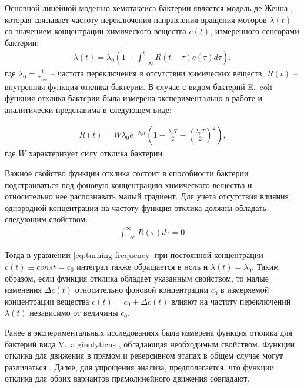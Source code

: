 Основной линейной моделью хемотаксиса бактерии является модель де Женна \cite{de_gennes_chemotaxis_2004}, которая связывает частоту переключения направления вращения моторов $\lambda(t)$ со значением концентрации химического вещества $c(t)$, измеренного сенсорами бактерии:
\begin{equation}
    \begin{aligned}
        \lambda(t)=\lambda_0 \left ( 1 - \int_{-\infty}^t R(t-\tau)c(\tau)d\tau \right ),
    \label{eq:turning-frequency}
    \end{aligned}
\end{equation}
где $\lambda_0=\frac{1}{\tau_{run}}$ -- частота переключения в отсутствии химических веществ, $R(t)$ -- внутренняя функция отклика бактерии. В случае с видом бактерий E.~coli функция отклика бактерии была измерена экспериментально в работе \cite{block_adaptation_1983} и аналитически представима в следующем виде:

\begin{equation}
    \begin{aligned}
        R(t) = W \lambda_0 e^{-\lambda_0t} \left ( 1 - \frac{\lambda_0T}{2} - \left (\frac{\lambda_0T}{2}\right )^2 \right ),
    \label{eq:response-ecoli}
    \end{aligned}
\end{equation}
где $W$ характеризует силу отклика бактерии.  

Важное свойство функции отклика состоит в способности бактерии подстраиваться под фоновую концентрацию химического вещества и относительно нее распознавать малый градиент. Для учета отсутствия влияния однородной концентрации на частоту функция отклика должны обладать следующим свойством:  
\begin{equation}
    \begin{aligned}
        \int_{-\infty}^{\infty} R(\tau)d\tau = 0.
    \label{eq:response-ecoli-zero}
    \end{aligned}
\end{equation}

Тогда в уравнении \cref{eq:turning-frequency} при постоянной концентрации $c(t)\equiv const = c_0$ интеграл также обращается в ноль и $\lambda(t)=\lambda_0$. Таким образом, если функция отклика обладает указанным свойством, то малые изменения $\Delta c(t)$ относительно фоновой концентрации $c_0$ в измеряемой концентрации вещества $c(t)=c_0+\Delta c(t)$ влияют на частоту переключений $\lambda(t)$ независимо от величины $c_0$. 

Ранее в экспериментальных исследованиях была измерена функция отклика для бактерий вида V.~alginolyticus \cite{xie_element_2015}, обладающая необходимым свойством. Функции отклика для движения в прямом и реверсивном этапах в общем случае могут различаться \cite{xie_marine_2015}. Далее, для упрощения анализа, предполагается, что функции отклика для обоих вариантов прямолинейного движения совпадают.


